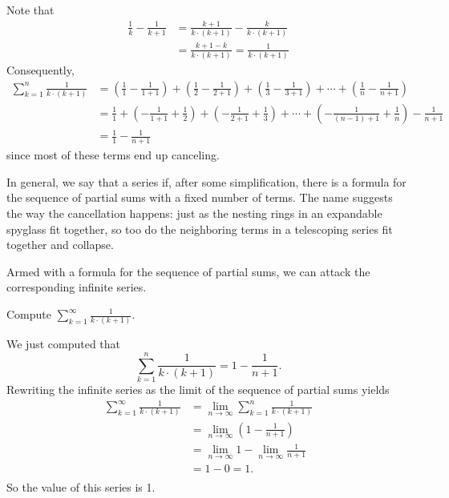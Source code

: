 \begin{solution}
  Note that
\begin{align*}
  \frac{1}{k} - \frac{1}{k+1}
&= \frac{k+1}{k \cdot (k+1)} - \frac{k}{k \cdot (k+1)} \\
&= \frac{k+1 - k}{k \cdot (k+1)} = \frac{1}{k \cdot (k+1)}
\end{align*}
  Consequently,
\begin{align*}
\sum_{k=1}^n \frac{1}{k \cdot (k+1)} &=
\left( \frac{1}{1} - \frac{1}{1+1} \right) + 
\left( \frac{1}{2} - \frac{1}{2+1} \right) + 
\left( \frac{1}{3} - \frac{1}{3+1} \right) + \cdots + 
\left( \frac{1}{n} - \frac{1}{n+1} \right) \\
&=
\frac{1}{1} +
\left( - \frac{1}{1+1} + \frac{1}{2} \right) + 
\left(- \frac{1}{2+1} + \frac{1}{3} \right) + \cdots + 
\left( - \frac{1}{(n-1)+1} + \frac{1}{n} \right) 
- \frac{1}{n+1} \\
&= \frac{1}{1} - \frac{1}{n+1}
\end{align*}
since most of these terms end up canceling.
\end{solution}




In general, we say that a series
 if, after some simplification, there is a formula for
the sequence of partial sums with a fixed number of terms.  The name
suggests the way the cancellation happens: just as the nesting rings
in an expandable spyglass fit together, so too do the neighboring
terms in a telescoping series fit together and collapse.

Armed with a formula for the sequence of partial sums, we can attack the corresponding infinite series.

\begin{example}
Compute $\sum_{k=1}^\infty \frac{1}{k \cdot (k+1)}$.
\end{example}
\begin{solution}
We just computed that
$$
\sum_{k=1}^n \frac{1}{k \cdot (k+1)} = 1 - \frac{1}{n+1}.
$$
Rewriting the infinite series as the limit of the sequence of partial sums yields
\begin{align*}
\sum_{k=1}^\infty \frac{1}{k \cdot (k+1)} &= \lim_{n \to \infty} \sum_{k=1}^n \frac{1}{k \cdot (k+1)} \\
&= \lim_{n \to \infty} \left( 1 - \frac{1}{n+1} \right) \\
&= \lim_{n \to \infty} 1 - \lim_{n \to \infty} \frac{1}{n+1} \\
&= 1 - 0 = 1.\\
\end{align*}
So the value of this series is 1.
\end{solution}

